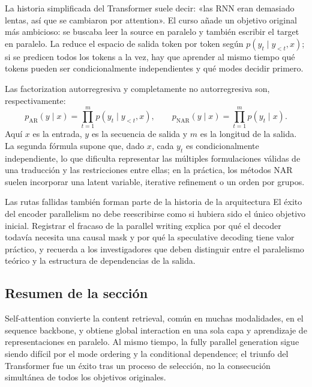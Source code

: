 La historia simplificada del Transformer suele decir: «las RNN eran demasiado lentas, así que se cambiaron por attention». El curso añade un objetivo original más ambicioso: se buscaba leer la source en paralelo y también escribir el target en paralelo. La  reduce el espacio de salida token por token según $p(y_t\mid y_{<t},x)$; si se predicen todos los tokens a la vez, hay que aprender al mismo tiempo qué tokens pueden ser condicionalmente independientes y qué modes decidir primero.


Las factorization autorregresiva y completamente no autorregresiva son, respectivamente:
\[
p_{\mathrm{AR}}(y\mid x)=\prod_{t=1}^{m}p(y_t\mid y_{<t},x),\qquad
p_{\mathrm{NAR}}(y\mid x)=\prod_{t=1}^{m}p(y_t\mid x).
\]
Aquí $x$ es la entrada, $y$ es la secuencia de salida y $m$ es la longitud de la salida. La segunda fórmula supone que, dado $x$, cada $y_t$ es condicionalmente independiente, lo que dificulta representar las múltiples formulaciones válidas de una traducción y las restricciones entre ellas; en la práctica, los métodos NAR suelen incorporar una latent variable, iterative refinement o un orden por grupos.


\begin{warningbox}{Las rutas fallidas también forman parte de la historia de la arquitectura}
El éxito del encoder parallelism no debe reescribirse como si hubiera sido el único objetivo inicial. Registrar el fracaso de la parallel writing explica por qué el decoder todavía necesita una causal mask y por qué la speculative decoding tiene valor práctico, y recuerda a los investigadores que deben distinguir entre el paralelismo teórico y la estructura de dependencias de la salida.
\end{warningbox}

\subsection{Resumen de la sección}

Self-attention convierte la content retrieval, común en muchas modalidades, en el sequence backbone, y obtiene global interaction en una sola capa y aprendizaje de representaciones en paralelo. Al mismo tiempo, la fully parallel generation sigue siendo difícil por el mode ordering y la conditional dependence; el triunfo del Transformer fue un éxito tras un proceso de selección, no la consecución simultánea de todos los objetivos originales.

